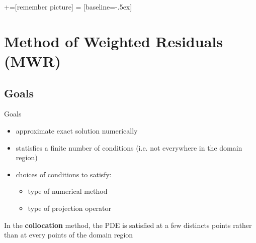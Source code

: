 %
%
%
%
%

\date{January 14,21 2008}



+=[remember picture]
 = [baseline=-.5ex]

\everymath{\displaystyle}

\subtitle{}

\begin{frame}
  \maketitle
\end{frame}

\begin{frame}
  \tableofcontents
\end{frame}

\section[Weighted Residuals]{Method of Weighted Residuals (MWR)}
\label{sec:meth-weight-resid}

\subsection{Goals}
\label{sec:goals}

\begin{frame}{Goals}
  \begin{itemize}
  \item approximate exact solution numerically
  \item statisfies a finite number of conditions (i.e. not everywhere in the domain region)
  \item choices of conditions to satisfy:
    \begin{itemize}
    \item type of numerical method
    \item type of projection operator
    \end{itemize}
  \end{itemize}
  \begin{example}
    In the \textbf{collocation} method, the PDE is satisfied at a few
    distincts points rather than at every points of the domain
    region
  \end{example}
\end{frame}

